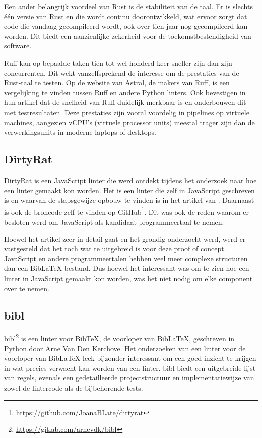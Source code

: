Een ander belangrijk voordeel van Rust is de stabiliteit van de taal. Er is slechts één versie van Rust en die wordt continu doorontwikkeld, wat ervoor zorgt dat code die vandaag gecompileerd wordt, ook over tien jaar nog gecompileerd kan worden. Dit biedt een aanzienlijke zekerheid voor de toekomstbestendigheid van software.

Ruff kan op bepaalde taken tien tot wel honderd keer sneller zijn dan zijn concurrenten. Dit wekt vanzelfsprekend de interesse om de prestaties van de Rust-taal te testen. Op de website van Astral, de makers van Ruff, is een vergelijking te vinden tussen Ruff en andere Python linters. Ook \textcite{TurnerTrauring2023} bevestigen in hun artikel dat de snelheid van Ruff duidelijk merkbaar is en onderbouwen dit met testresultaten. Deze prestaties zijn vooral voordelig in pipelines op virtuele machines, aangezien vCPU's (virtuele processor units) meestal trager zijn dan de verwerkingsunits in moderne laptops of desktops.

\subsection{DirtyRat}
\label{subsec:dirtyrat}
DirtyRat is een JavaScript linter die werd ontdekt tijdens het onderzoek naar hoe een linter gemaakt kon worden. Het is een linter die zelf in JavaScript geschreven is en waarvan de stapsgewijze opbouw te vinden is in het artikel van \textcite{BorgesLate2021}. Daarnaast is ook de broncode zelf te vinden op GitHub\footnote{\url{https://github.com/JoanaBLate/dirtyrat}}. Dit was ook de reden waarom er besloten werd om JavaScript als kandidaat-programmeertaal te nemen.

Hoewel het artikel zeer in detail gaat en het grondig onderzocht werd, werd er vastgesteld dat het toch wat te uitgebreid is voor deze proof of concept. JavaScript en andere programmeertalen hebben veel meer complexe structuren dan een BibLaTeX-bestand. Dus hoewel het interessant was om te zien hoe een linter in JavaScript gemaakt kon worden, was het niet nodig om elke component over te nemen.

\subsection{bibl}
bibl\footnote{\url{https://gitlab.com/arnevdk/bibl}} is een linter voor BibTeX, de voorloper van BibLaTeX, geschreven in Python door Arne Van Den Kerchove. Het onderzoeken van een linter voor de voorloper van BibLaTeX leek bijzonder interessant om een goed inzicht te krijgen in wat precies verwacht kan worden van een linter. bibl biedt een uitgebreide lijst van regels, evenals een gedetailleerde projectstructuur en implementatiewijze van zowel de lintercode als de bijbehorende tests.

